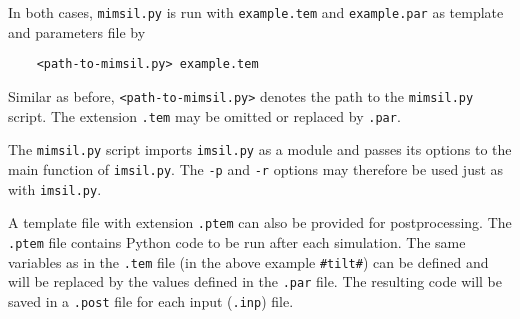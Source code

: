 In both cases, \texttt{mimsil.py} is run with \texttt{example.tem} and
\texttt{example.par} as template and parameters file by
%
\begin{verbatim}
    <path-to-mimsil.py> example.tem
\end{verbatim}
%
Similar as before, \texttt{<path-to-mimsil.py>} denotes the path to the
\texttt{mimsil.py} script. The extension \texttt{.tem} may be omitted or
replaced by \texttt{.par}.

The \texttt{mimsil.py} script imports \texttt{imsil.py} as a module and passes
its options to the main function of \texttt{imsil.py}. The \texttt{-p} and
\texttt{-r} options may therefore be used just as with \texttt{imsil.py}.

A template file with extension \texttt{.ptem} can also be provided for
postprocessing. The \texttt{.ptem} file contains Python code to be run after
each simulation. The same variables as in the \texttt{.tem} file (in the
above example \texttt{\#tilt\#}) can be defined and will be replaced by the
values defined in the \texttt{.par} file. The resulting code will be
saved in a \texttt{.post} file for each input (\texttt{.inp}) file.
